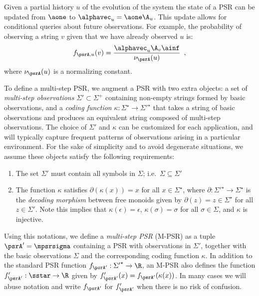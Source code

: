 %
Given a partial history $u$ of the evolution of the system the state of a PSR can be updated from $\aone$ to $\alphavec_u = \aone \A_u$. This update allows for conditional queries about future observations. For example, the probability of observing a string $v$ given that we have already observed $u$ is:
\begin{equation*}
f_{\psrA,u}(v) = \frac{\alphavec_u \A_v \ainf}{\nu_{\psrA}(u)} \enspace,
\end{equation*}
where $\nu_{\psrA}(u)$ is a normalizing constant.

To define a multi-step PSR, we augment a PSR with two extra objects: a set of \emph{multi-step observations} $\Sigma' \subset \Sigma^+$ containing non-empty strings formed by basic observations, and a \emph{coding function} $\kappa : \Sigma^\star \to {\Sigma'}^{\star}$ that takes a string of basic observations and produces an equivalent string composed of multi-step observations.
%
The choice of $\Sigma'$ and $\kappa$ can be customized for each application, and will typically capture frequent patterns of observations arising in a particular environment. For the sake of simplicity and to avoid degenerate situations, we assume these objects satisfy the following requirements:
\begin{enumerate}
\item The set $\Sigma'$ must contain all symbols in $\Sigma$; i.e.\ $\Sigma \subseteq \Sigma'$
\item The function $\kappa$ satisfies $\partial(\kappa(x)) = x$ for all $x \in \Sigma^\star$, where $\partial : {\Sigma'}^\star \to \Sigma^\star$ is the \emph{decoding morphism} between free monoids given by $\partial(z) = z \in \Sigma^\star$ for all $z \in \Sigma'$. Note this implies that $\kappa(\epsilon) = \epsilon$, $\kappa(\sigma) = \sigma$ for all $\sigma \in \Sigma$, and $\kappa$ is injective.
\end{enumerate}
Using this notations, we define a \emph{multi-step PSR} (M-PSR) as a tuple $\psrA' = \mpsrsigma$ containing a PSR with observations in $\Sigma'$, together with the basic observations $\Sigma$ and the corresponding coding function $\kappa$. In addition to the standard PSR function $f_{\psrA'} : {\Sigma'}^\star \to \R$, an M-PSR also defines the function $f_{\psrA'}' : \sstar \to \R$ given by $f_{\psrA'}'(x) = f_{\psrA'}(\kappa(x))$. In many cases we will abuse  notation and write $f_{\psrA'}$ for $f_{\psrA'}'$ when there is no risk of confusion.

